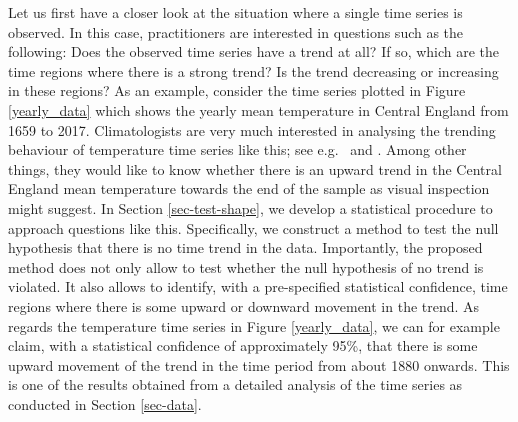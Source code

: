 Let us first have a closer look at the situation where a single time series is observed. In this case, practitioners are interested in questions such as the following: Does the observed time series have a trend at all? If so, which are the time regions where there is a strong trend? Is the trend decreasing or increasing in these regions? As an example, consider the time series plotted in Figure \ref{yearly_data} which shows the yearly mean temperature in Central England from 1659 to 2017. Climatologists are very much interested in analysing the trending behaviour of temperature time series like this; see e.g.\ \cite{Benner1999} and \cite{Rahmstorf2017}. Among other things, they would like to know whether there is an upward trend in the Central England mean temperature towards the end of the sample as visual inspection might suggest. In Section \ref{sec-test-shape}, we develop a statistical procedure to approach questions like this. Specifically, we construct a method to test the null hypothesis that there is no time trend in the data. Importantly, the proposed method does not only allow to test whether the null hypothesis of no trend is violated. It also allows to identify, with a pre-specified statistical confidence, time regions where there is some upward or downward movement in the trend. As regards the temperature time series in Figure \ref{yearly_data}, we can for example claim, with a statistical confidence of approximately 95\%, that there is some upward movement of the trend in the time period from about 1880 onwards. This is one of the results obtained from a detailed analysis of the time series as conducted in Section \ref{sec-data}. 


